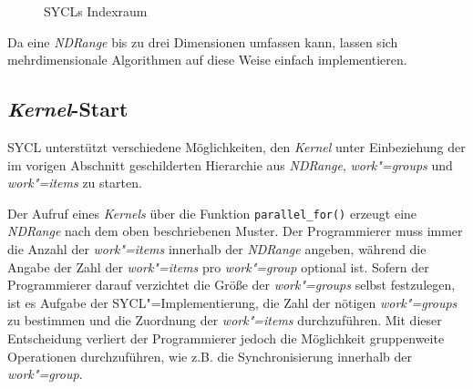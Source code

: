 \begin{figure}
    \caption{SYCLs Indexraum \cite[nach][25]{opencl2012}}
    \label{sycl:konzepte:abstraktion:ndrange}
\end{figure}

Da eine \textit{NDRange} bis zu drei Dimensionen umfassen kann, lassen sich
mehrdimensionale Algorithmen auf diese Weise einfach implementieren.

\subsection{\textit{Kernel}-Start}
\label{sycl:konzepte:kernelstart}

SYCL unterstützt verschiedene Möglichkeiten, den \textit{Kernel} unter
Einbeziehung der im vorigen Abschnitt geschilderten Hierarchie aus
\textit{NDRange}, \textit{work"=groups} und \textit{work"=items} zu starten.

Der Aufruf eines \textit{Kernels} über die Funktion \texttt{parallel\_for()}
erzeugt eine \textit{NDRange} nach dem oben beschriebenen Muster. Der
Programmierer muss immer die Anzahl der \textit{work"=items} innerhalb der
\textit{NDRange} angeben, während die Angabe der Zahl der \textit{work"=items}
pro \textit{work"=group} optional ist. Sofern der Programmierer darauf
verzichtet die Größe der \textit{work"=groups} selbst festzulegen, ist es
Aufgabe der SYCL"=Implementierung, die Zahl der nötigen \textit{work"=groups} zu
bestimmen und die Zuordnung der \textit{work"=items} durchzuführen. Mit dieser
Entscheidung verliert der Programmierer jedoch die Möglichkeit gruppenweite
Operationen durchzuführen, wie z.B. die Synchronisierung innerhalb der
\textit{work"=group}.

